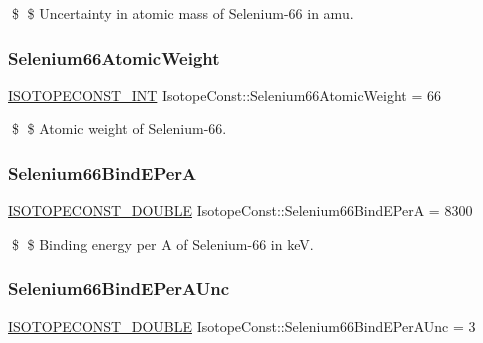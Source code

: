 \$ \$ Uncertainty in atomic mass of Selenium-\/66 in amu. \mbox{\label{group___isotope_const-_selenium-_se66_ga4b218fe4791c9cad7dc0a50d2d47bfbd}} 
\subsubsection{\texorpdfstring{Selenium66\+Atomic\+Weight}{Selenium66AtomicWeight}}
{\footnotesize\ttfamily \mbox{\hyperlink{group___isotope_const-_macros_ga5f18360b3e99483a35c32d789e62621c}{I\+S\+O\+T\+O\+P\+E\+C\+O\+N\+S\+T\+\_\+\+I\+NT}} Isotope\+Const\+::\+Selenium66\+Atomic\+Weight = 66}

\$ \$ Atomic weight of Selenium-\/66. \mbox{\label{group___isotope_const-_selenium-_se66_ga2388b8a39b6d0b61870cbd8048108d11}} 
\subsubsection{\texorpdfstring{Selenium66\+Bind\+E\+PerA}{Selenium66BindEPerA}}
{\footnotesize\ttfamily \mbox{\hyperlink{group___isotope_const-_macros_ga8f45a7272ce02c0b4c65c44636ed719a}{I\+S\+O\+T\+O\+P\+E\+C\+O\+N\+S\+T\+\_\+\+D\+O\+U\+B\+LE}} Isotope\+Const\+::\+Selenium66\+Bind\+E\+PerA = 8300}

\$ \$ Binding energy per A of Selenium-\/66 in keV. \mbox{\label{group___isotope_const-_selenium-_se66_ga6d2e2a70f2eb8f0daec253515fc3d532}} 
\subsubsection{\texorpdfstring{Selenium66\+Bind\+E\+Per\+A\+Unc}{Selenium66BindEPerAUnc}}
{\footnotesize\ttfamily \mbox{\hyperlink{group___isotope_const-_macros_ga8f45a7272ce02c0b4c65c44636ed719a}{I\+S\+O\+T\+O\+P\+E\+C\+O\+N\+S\+T\+\_\+\+D\+O\+U\+B\+LE}} Isotope\+Const\+::\+Selenium66\+Bind\+E\+Per\+A\+Unc = 3}

